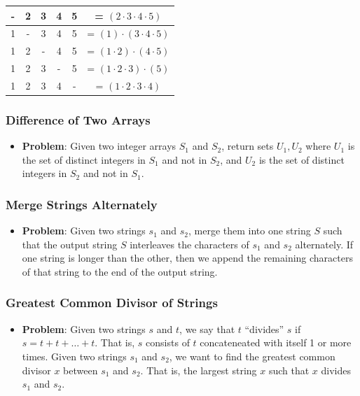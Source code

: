 \documentclass[10pt,a4paper]{article}
\begin{document}
\begin{itemize}
    \begin{center}
        \begin{tabular}{c|c|c|c|c|c}
            - & 2 & 3 & 4 & 5 & = $(2 \cdot 3 \cdot 4 \cdot 5)$\\
            \hline
            1 & - & 3 & 4 & 5 & = $(1) \cdot (3 \cdot 4 \cdot 5)$ \\
            \hline
            1 & 2 & - & 4 & 5 & = $(1 \cdot 2) \cdot  (4 \cdot 5)$ \\
            \hline
            1 & 2 & 3 & - & 5 & = $(1 \cdot 2 \cdot 3) \cdot (5)$ \\
            \hline
            1 & 2 & 3 & 4 & - & = $(1 \cdot 2 \cdot 3 \cdot 4)$ \\
        \end{tabular}
    \end{center}



    
\end{itemize}





\subsubsection*{Difference of Two Arrays}
\begin{itemize}
    \item \textbf{Problem}: Given two integer arrays $S_1$ and $S_2$, return sets $U_1,U_2$ where $U_1$ is the set of distinct integers in $S_1$ and not in $S_2$, and $U_2$ is the set of distinct integers in $S_2$ and not in $S_1$.
\end{itemize}

\subsubsection*{Merge Strings Alternately}
\begin{itemize}
    \item \textbf{Problem}: Given two strings $s_1$ and $s_2$, merge them into one string $S$ such that the output string $S$ interleaves the characters of $s_1$ and $s_2$ alternately. If one string is longer than the other, then we append the remaining characters of that string to the end of the output string.
\end{itemize}


\subsubsection*{Greatest Common Divisor of Strings}
\begin{itemize}
    \item \textbf{Problem}: Given two strings $s$ and $t$, we say that $t$ ``divides'' $s$ if $s = t + t + \dots + t$. That is, $s$ consists of $t$ concateneated with  itself 1 or more times. Given two strings $s_1$ and $s_2$, we want to find the greatest common divisor $x$ between $s_1$ and $s_2$. That is, the largest string $x$ such that $x$ divides $s_1$ and $s_2$.
\end{itemize}
\end{document}
